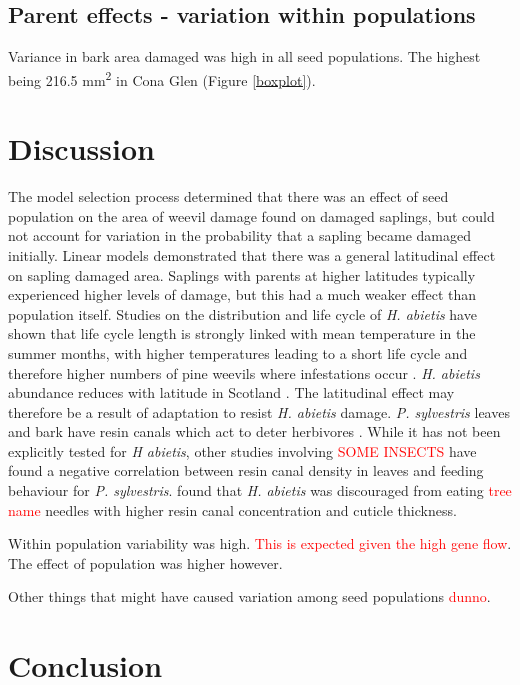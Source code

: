 \documentclass[a4paper, 11pt]{article}
\newcommand{\todo}[1]{\textcolor{red}{#1}}   %
\begin{document}
\subsection*{Parent effects - variation within populations}

Variance in bark area damaged was high in all seed populations. The highest being 216.5 mm\textsuperscript{2} in Cona Glen (Figure \ref{boxplot}).

\section*{Discussion}

The model selection process determined that there was an effect of seed population on the area of weevil damage found on damaged saplings, but could not account for variation in the probability that a sapling became damaged initially. Linear models demonstrated that there was a general latitudinal effect on sapling damaged area. Saplings with parents at higher latitudes typically experienced higher levels of damage, but this had a much weaker effect than population itself. Studies on the distribution and life cycle of \textit{H. abietis} have shown that life cycle length is strongly linked with mean temperature in the summer months, with higher temperatures leading to a short life cycle and therefore higher numbers of pine weevils where infestations occur \citep{Leather1999}. \textit{H. abietis} abundance reduces with latitude in Scotland \citep{Barredo2015}. The latitudinal effect may therefore be a result of adaptation to resist \textit{H. abietis} damage. \textit{P. sylvestris} leaves and bark have resin canals which act to deter herbivores \citep{}. While it has not been explicitly tested for \textit{H abietis}, other studies involving \todo{SOME INSECTS} have found a negative correlation between resin canal density in leaves and feeding behaviour for \textit{P. sylvestris}. \citet{} found that \textit{H. abietis} was discouraged from eating \todo{tree name} needles with higher resin canal concentration and cuticle thickness.

Within population variability was high. \todo{This is expected given the high gene flow}. The effect of population was higher however.

Other things that might have caused variation among seed populations \todo{dunno}.


\section*{Conclusion}
\end{document}
